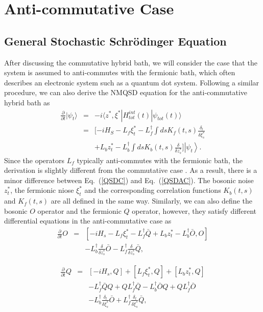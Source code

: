 \documentclass[preprint]{elsarticle}
\begin{document}
\section{\label{sec:IV}Anti-commutative Case}


\subsection{\label{sub:IV-A}General Stochastic Schr\"{o}dinger Equation}

After discussing the commutative hybrid bath, we will consider the
case that the system is assumed to anti-commutes with the fermionic bath, which often
describes an electronic system such as a quantum dot system. Following a similar
procedure, we can also derive the NMQSD equation for the anti-commutative
hybrid bath as
\begin{eqnarray}
\frac{\partial}{\partial t}|\psi_{t}\rangle & = & -i\langle z^{*},\xi^{*}|H_{tot}^{int}(t)|\psi_{tot}(t)\rangle\nonumber \\
 & = & [-iH_{S}-L_{f}\xi_{t}^{\ast}-L_{f}^{\dagger}\int dsK_{f}(t,s)\frac{\delta_{l}}{\delta\xi_{s}^{\ast}}\nonumber \\
 &  & +L_{b}z_{t}^{\ast}-L_{b}^{\dagger}\int dsK_{b}(t,s)\frac{\delta}{\delta z_{s}^{\ast}}]\left\vert \psi_{t}\right\rangle .\label{QSDAC}
\end{eqnarray}
Since the operators $L_{f}$ typically anti-commutes with the fermionic
bath, the derivation is slightly different from the commutative case
\cite{ChenFB,ShiFB,ZhaoFB}. As a result, there is a minor difference
between Eq.~(\ref{QSDC}) and Eq.~(\ref{QSDAC}). The bosonic noise
$z_{t}^{*}$, the fermionic niose $\xi_{t}^{*}$ and the corresponding
correlation functions $K_{b}(t,s)$ and $K_{f}(t,s)$ are all defined
in the same way. Similarly, we can also define the bosonic $O$ operator
and the fermionic $Q$ operator, however, they satisfy different differential
equations in the anti-commutative case as 
\begin{eqnarray}
\frac{\partial}{\partial t}O & = & [-iH_{s}-L_{f}\xi_{t}^{\ast}-L_{f}^{\dagger}\bar{Q}+L_{b}z_{t}^{*}-L_{b}^{\dagger}\bar{O},O]\nonumber \\
 &  & -L_{b}^{\dagger}\frac{\delta}{\delta z_{s}^{*}}\bar{O}-L_{f}^{\dagger}\frac{\delta}{\delta z_{s}^{*}}\bar{Q},
\end{eqnarray}


\noindent 
\begin{eqnarray}
\frac{\partial}{\partial t}Q & = & [-iH_{s},Q]+[L_{f}\xi_{t}^{*},Q]+[L_{b}z_{t}^{*},Q]\nonumber \\
 &  & -L_{f}^{\dagger}\bar{Q}Q+QL_{f}^{\dagger}\bar{Q}-L_{b}^{\dagger}\bar{O}Q+QL_{f}^{\dagger}\bar{O}\nonumber \\
 &  & -L_{b}^{\dagger}\frac{\delta_{l}}{\delta\xi_{s}^{\ast}}\bar{O}+L_{f}^{\dagger}\frac{\delta_{l}}{\delta\xi_{s}^{*}}\bar{Q},
\end{eqnarray}
\end{document}
